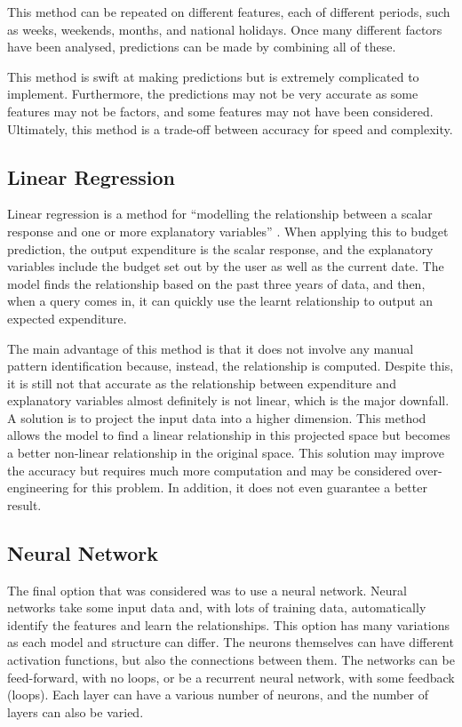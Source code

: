 This method can be repeated on different features, each of different periods, such as weeks, weekends, months, and national holidays. Once many different factors have been analysed, predictions can be made by combining all of these.

This method is swift at making predictions but is extremely complicated to implement. Furthermore, the predictions may not be very accurate as some features may not be factors, and some features may not have been considered. Ultimately, this method is a trade-off between accuracy for speed and complexity.

\subsection{Linear Regression}
Linear regression is a method for ``modelling the relationship between a scalar response and one or more explanatory variables'' \cite{LinearRegressionWiki}. When applying this to budget prediction, the output expenditure is the scalar response, and the explanatory variables include the budget set out by the user as well as the current date. The model finds the relationship based on the past three years of data, and then, when a query comes in, it can quickly use the learnt relationship to output an expected expenditure.

The main advantage of this method is that it does not involve any manual pattern identification because, instead, the relationship is computed. Despite this, it is still not that accurate as the relationship between expenditure and explanatory variables almost definitely is not linear, which is the major downfall. A solution is to project the input data into a higher dimension. This method allows the model to find a linear relationship in this projected space but becomes a better non-linear relationship in the original space. This solution may improve the accuracy but requires much more computation and may be considered over-engineering for this problem. In addition, it does not even guarantee a better result.

\subsection{Neural Network}
The final option that was considered was to use a neural network. Neural networks take some input data and, with lots of training data, automatically identify the features and learn the relationships. This option has many variations as each model and structure can differ. The neurons themselves can have different activation functions, but also the connections between them. The networks can be feed-forward, with no loops, or be a recurrent neural network, with some feedback (loops). Each layer can have a various number of neurons, and the number of layers can also be varied.

